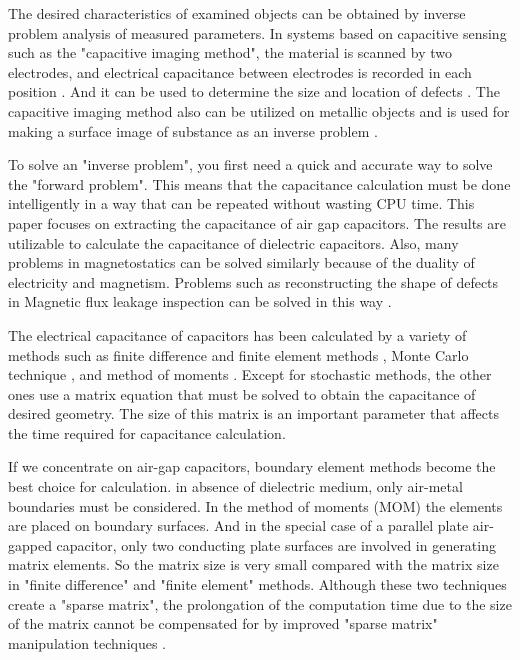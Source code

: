 \documentclass[final,5p,times,twocolumn]{elsarticle}
\begin{document}
The desired characteristics of examined objects can be obtained by inverse problem analysis of measured parameters. In systems based on capacitive sensing such as the "capacitive imaging method", the material is scanned by two electrodes, and electrical capacitance between electrodes is recorded in each position \cite{Diamond2006, Ma2020}. And it can be used to determine the size and location of defects \cite{Liu2017}. The capacitive imaging method also can be utilized on metallic objects and is used for making a surface image of substance as an inverse problem \cite{Muttakin2018}.

To solve an "inverse problem", you first need a quick and accurate way to solve the "forward problem".  This means that the capacitance calculation must be done intelligently in a way that can be repeated without wasting CPU time. This paper focuses on extracting the capacitance of air gap capacitors. The results are utilizable to calculate the capacitance of dielectric capacitors. Also, many problems in magnetostatics can be solved similarly because of the duality of electricity and magnetism. Problems such as reconstructing the shape of defects in Magnetic flux leakage inspection can be solved in this way \cite{Dutta2008}.

The electrical capacitance of capacitors has been calculated by a variety of methods such as finite difference and finite element methods \cite{Izquierdo2009}, Monte Carlo technique \cite {LeCoZ1992, Song2020}, and method of moments \cite {Bai2004}. Except for stochastic methods, the other ones use a  matrix equation that must be solved to obtain the capacitance of desired geometry. The size of this matrix is an important parameter that affects the time required for capacitance calculation.

If we concentrate on air-gap capacitors, boundary element methods become the best choice for calculation. in  absence of dielectric medium, only air-metal boundaries must be considered. In the method of moments (MOM) the elements are placed on boundary surfaces. And in the special case of a parallel plate air-gapped capacitor, only two conducting plate surfaces are involved in generating matrix elements. So the matrix size is very small compared with the matrix size in "finite difference" and "finite element" methods. Although these two techniques create a "sparse matrix", the prolongation of the computation time due to the size of the matrix cannot be compensated for by improved "sparse matrix" manipulation techniques \cite{Liao2004, Kolundzija1998}.
\end{document}
